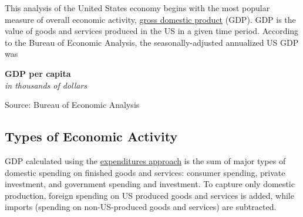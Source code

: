 \documentclass{report}
\makeatletter
\newcommand*\short[1]{\expandafter\@gobbletwo\number\numexpr#1\relax}
\newcommand{\shdateaxisticks}{
		date coordinates in=x, axis line style={draw=none},
		xmax={2024-01-31},
		max space between ticks=40,	    
		xtick={{1990-01-01}, {1995-01-01}, {2000-01-01}, 
			{2005-01-01}, {2010-01-01}, {2015-01-01}, {2020-01-01}},
		minor xtick={},
		enlarge y limits={0.06}, enlarge x limits={0.01},
		xticklabel style={align=center, yshift=-2pt}, tick label style={inner sep=0pt},
		}
\newcommand{\stdline}[4]{\addplot[very thick, no markers, color=#1] 
		table [x=#2, y=#3, col sep=comma] {#4};	}
\newcommand{\rbars}{
		\fill[color=black!10] (axis cs:{1990-07-01},\pgfkeysvalueof{/pgfplots/ymin})
			rectangle (axis cs:{1991-03-01}, \pgfkeysvalueof{/pgfplots/ymax});
		\fill[color=black!10] (axis cs:{2007-12-01},\pgfkeysvalueof{/pgfplots/ymin})
			rectangle (axis cs:{2009-07-01}, \pgfkeysvalueof{/pgfplots/ymax});
		\fill[color=black!10] (axis cs:{2001-03-01},\pgfkeysvalueof{/pgfplots/ymin})
			rectangle (axis cs:{2001-11-01}, \pgfkeysvalueof{/pgfplots/ymax});
		\fill[color=black!10] (axis cs:{2020-02-01},\pgfkeysvalueof{/pgfplots/ymin})
			rectangle (axis cs:{2020-05-01}, \pgfkeysvalueof{/pgfplots/ymax});}
\makeatother
\begin{document}
\begin{minipage}{0.45\textwidth}
\small This analysis of the United States economy begins with the most popular measure of overall economic activity, \href{https://www.bea.gov/data/gdp/gross-domestic-product}{gross domestic product} (GDP). GDP is the value of goods and services produced in the US in a given time period. According to the Bureau of Economic Analysis, the seasonally-adjusted annualized US GDP was 
\end{minipage}\hfill
\begin{minipage}{0.45\textwidth}
\normalsize \textbf{GDP per capita}\\
\footnotesize{\textit{in thousands of dollars}}
\vspace{3.3cm}

\footnotesize{Source: Bureau of Economic Analysis}
\end{minipage}
\vspace*{-2mm}

\hypertarget{oety}{\label{oety}}
\begin{minipage}{1.0\textwidth}
\subsection*{Types of Economic Activity}
\small GDP calculated using the \href{https://www.bea.gov/help/glossary/expenditures-approach}{expenditures approach} is the sum of major types of domestic spending on finished goods and services: consumer spending, private investment, and government spending and investment. To capture only domestic production, foreign spending on US produced goods and services is added, while imports (spending on non-US-produced goods and services) are subtracted.
\end{minipage}
\end{document}
